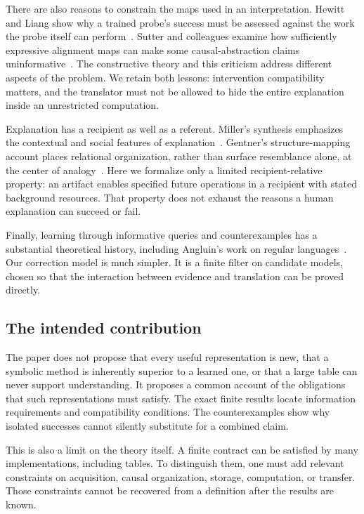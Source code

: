 There are also reasons to constrain the maps used in an interpretation. Hewitt and Liang show why a trained probe's success must be assessed against the work the probe itself can perform~\cite{MU:hewitt}. Sutter and colleagues examine how sufficiently expressive alignment maps can make some causal-abstraction claims uninformative~\cite{MU:sutter}. The constructive theory and this criticism address different aspects of the problem. We retain both lessons: intervention compatibility matters, and the translator must not be allowed to hide the entire explanation inside an unrestricted computation.

Explanation has a recipient as well as a referent. Miller's synthesis emphasizes the contextual and social features of explanation~\cite{MU:miller}. Gentner's structure-mapping account places relational organization, rather than surface resemblance alone, at the center of analogy~\cite{MU:gentner}. Here we formalize only a limited recipient-relative property: an artifact enables specified future operations in a recipient with stated background resources. That property does not exhaust the reasons a human explanation can succeed or fail.

Finally, learning through informative queries and counterexamples has a substantial theoretical history, including Angluin's work on regular languages~\cite{MU:angluin}. Our correction model is much simpler. It is a finite filter on candidate models, chosen so that the interaction between evidence and translation can be proved directly.

\subsection{The intended contribution}
The paper does not propose that every useful representation is new, that a symbolic method is inherently superior to a learned one, or that a large table can never support understanding. It proposes a common account of the obligations that such representations must satisfy. The exact finite results locate information requirements and compatibility conditions. The counterexamples show why isolated successes cannot silently substitute for a combined claim.

This is also a limit on the theory itself. A finite contract can be satisfied by many implementations, including tables. To distinguish them, one must add relevant constraints on acquisition, causal organization, storage, computation, or transfer. Those constraints cannot be recovered from a definition after the results are known.


